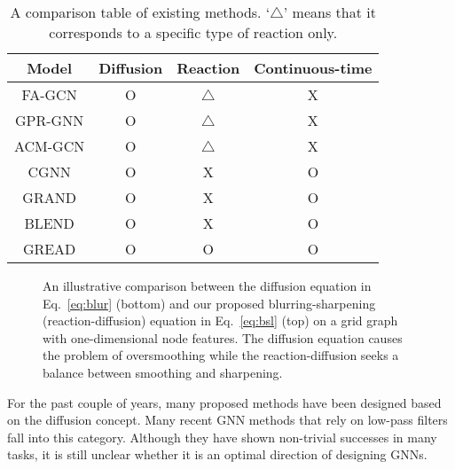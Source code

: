 \documentclass{article}
\theoremstyle{plain}
\theoremstyle{definition}
\theoremstyle{remark}
\begin{document}
\begin{table}[t]
\small
    \centering
    \setlength{\tabcolsep}{3pt}
    \caption{A comparison table of existing methods. `$\triangle$' means that it corresponds to a specific type of reaction only.}
    \begin{tabular}{cccc}\toprule
        Model     & Diffusion & Reaction    & Continuous-time\\\midrule
FA-GCN    & O         & $\triangle$ & X \\
        GPR-GNN   & O         & $\triangle$ & X \\
        ACM-GCN   & O         & $\triangle$ & X \\
        CGNN      & O         & X           & O \\
GRAND     & O         & X           & O \\
        BLEND     & O         & X           & O \\\midrule
        GREAD     & O         & O           & O \\
        \bottomrule
    \end{tabular}
    \label{tab:comp}
\end{table}

\begin{figure}[!t]
    \centering
    \caption{An illustrative comparison between the diffusion equation in Eq.~\eqref{eq:blur} (bottom) and our proposed blurring-sharpening (reaction-diffusion) equation in Eq.~\eqref{eq:bsl} (top) on a grid graph with one-dimensional node features. The diffusion equation causes the problem of oversmoothing while the reaction-diffusion seeks a balance between smoothing and sharpening.}
    \label{fig:teaser}
\end{figure}

For the past couple of years, many proposed methods have been designed based on the diffusion concept. Many recent GNN methods that rely on low-pass filters fall into this category. Although they have shown non-trivial successes in many tasks, it is still unclear whether it is an optimal direction of designing GNNs.
\end{document}
